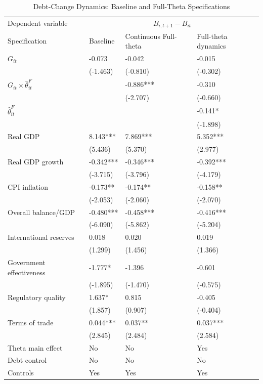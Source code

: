 \documentclass[11pt]{article}
\theoremstyle{definition}
\begin{document}
\begin{table}[H]\centering
\begin{threeparttable}
\caption{Debt-Change Dynamics: Baseline and Full-Theta Specifications}
\label{tab:debt_change_combined_fulltheta}
\scriptsize
\begin{tabularx}{\textwidth}{lYYY}
\toprule
Dependent variable &  \\
\cmidrule(lr){2-4}
Specification & Baseline & Continuous Full-theta & Full-theta dynamics \\
\midrule
$G_{it}$ & -0.073 & -0.042 & -0.015 \\
 & (-1.463) & (-0.810) & (-0.302) \\
$G_{it}\times\widehat{\theta}^{F}_{it}$ &  & -0.886*** & -0.310 \\
 &  & (-2.707) & (-0.660) \\
$\widehat{\theta}^{F}_{it}$ &  &  & -0.141* \\
 &  &  & (-1.898) \\
Real GDP & 8.143*** & 7.869*** & 5.352*** \\
 & (5.436) & (5.370) & (2.977) \\
Real GDP growth & -0.342*** & -0.346*** & -0.392*** \\
 & (-3.715) & (-3.796) & (-4.179) \\
CPI inflation & -0.173** & -0.174** & -0.158** \\
 & (-2.053) & (-2.060) & (-2.070) \\
Overall balance/GDP & -0.480*** & -0.458*** & -0.416*** \\
 & (-6.090) & (-5.862) & (-5.204) \\
International reserves & 0.018 & 0.020 & 0.019 \\
 & (1.299) & (1.456) & (1.366) \\
Government effectiveness & -1.777* & -1.396 & -0.601 \\
 & (-1.895) & (-1.470) & (-0.575) \\
Regulatory quality & 1.637* & 0.815 & -0.405 \\
 & (1.857) & (0.907) & (-0.404) \\
Terms of trade & 0.044*** & 0.037** & 0.037*** \\
 & (2.845) & (2.484) & (2.584) \\
\midrule
Theta main effect & No & No & Yes \\
Debt control & No & No & No \\
Controls & Yes & Yes & Yes \\

\end{tabularx}
\end{threeparttable}
\end{table}
\end{document}
